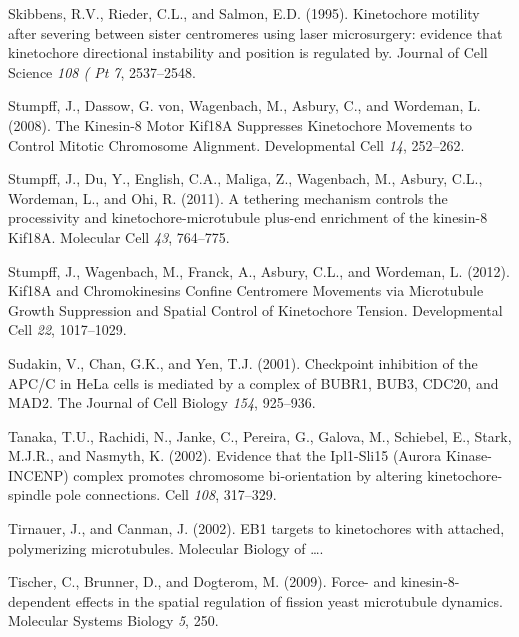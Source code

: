 \documentclass[12pt,a4paper,twoside,openright]{book}
\begin{document}
Skibbens, R.V., Rieder, C.L., and Salmon, E.D. (1995). Kinetochore
motility after severing between sister centromeres using laser
microsurgery: evidence that kinetochore directional instability and
position is regulated by. Journal of Cell Science \emph{108 ( Pt 7},
2537--2548.

Stumpff, J., Dassow, G. von, Wagenbach, M., Asbury, C., and Wordeman, L.
(2008). The Kinesin-8 Motor Kif18A Suppresses Kinetochore Movements to
Control Mitotic Chromosome Alignment. Developmental Cell \emph{14},
252--262.

Stumpff, J., Du, Y., English, C.A., Maliga, Z., Wagenbach, M., Asbury,
C.L., Wordeman, L., and Ohi, R. (2011). A tethering mechanism controls
the processivity and kinetochore-microtubule plus-end enrichment of the
kinesin-8 Kif18A. Molecular Cell \emph{43}, 764--775.

Stumpff, J., Wagenbach, M., Franck, A., Asbury, C.L., and Wordeman, L.
(2012). Kif18A and Chromokinesins Confine Centromere Movements via
Microtubule Growth Suppression and Spatial Control of Kinetochore
Tension. Developmental Cell \emph{22}, 1017--1029.

Sudakin, V., Chan, G.K., and Yen, T.J. (2001). Checkpoint inhibition of
the APC/C in HeLa cells is mediated by a complex of BUBR1, BUB3, CDC20,
and MAD2. The Journal of Cell Biology \emph{154}, 925--936.

Tanaka, T.U., Rachidi, N., Janke, C., Pereira, G., Galova, M., Schiebel,
E., Stark, M.J.R., and Nasmyth, K. (2002). Evidence that the Ipl1-Sli15
(Aurora Kinase-INCENP) complex promotes chromosome bi-orientation by
altering kinetochore-spindle pole connections. Cell \emph{108},
317--329.

Tirnauer, J., and Canman, J. (2002). EB1 targets to kinetochores with
attached, polymerizing microtubules. Molecular Biology of \ldots{}.

Tischer, C., Brunner, D., and Dogterom, M. (2009). Force- and
kinesin-8-dependent effects in the spatial regulation of fission yeast
microtubule dynamics. Molecular Systems Biology \emph{5}, 250.
\end{document}
